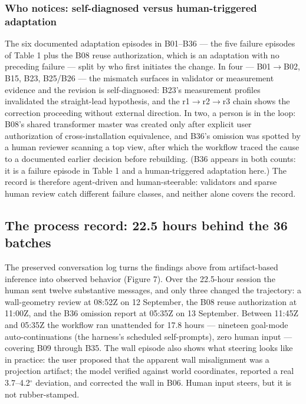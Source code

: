 \documentclass[10pt,a4paper]{article}
\begin{document}
\hypertarget{who-notices-self-diagnosed-versus-human-triggered-adaptation}{%
\subsubsection{Who notices: self-diagnosed versus human-triggered
adaptation}\label{who-notices-self-diagnosed-versus-human-triggered-adaptation}}

The six documented adaptation episodes in B01--B36 --- the five failure
episodes of Table 1 plus the B08 reuse authorization, which is an
adaptation with no preceding failure --- split by who first initiates
the change. In four --- B01\(\rightarrow\)B02, B15, B23, B25/B26 --- the
mismatch surfaces in validator or measurement evidence and the revision
is self-diagnosed: B23's measurement profiles invalidated the
straight-lead hypothesis, and the r1\(\rightarrow\)r2\(\rightarrow\)r3
chain shows the correction proceeding without external direction. In
two, a person is in the loop: B08's shared transformer master was
created only after explicit user authorization of cross-installation
equivalence, and B36's omission was spotted by a human reviewer scanning
a top view, after which the workflow traced the cause to a documented
earlier decision before rebuilding. (B36 appears in both counts: it is a
failure episode in Table 1 and a human-triggered adaptation here.) The
record is therefore agent-driven and human-steerable: validators and
sparse human review catch different failure classes, and neither alone
covers the record.

\hypertarget{the-process-record-22.5-hours-behind-the-36-batches}{%
\subsection{The process record: 22.5 hours behind the 36
batches}\label{the-process-record-22.5-hours-behind-the-36-batches}}

The preserved conversation log turns the findings above from
artifact-based inference into observed behavior (Figure 7). Over the
22.5-hour session the human sent twelve substantive messages, and only
three changed the trajectory: a wall-geometry review at 08:52Z on 12
September, the B08 reuse authorization at 11:00Z, and the B36 omission
report at 05:35Z on 13 September. Between 11:45Z and 05:35Z the workflow
ran unattended for 17.8 hours --- nineteen goal-mode auto-continuations
(the harness's scheduled self-prompts), zero human input --- covering
B09 through B35. The wall episode also shows what steering looks like in
practice: the user proposed that the apparent wall misalignment was a
projection artifact; the model verified against world coordinates,
reported a real 3.7--4.2\(^\circ\) deviation, and corrected the wall in
B06. Human input steers, but it is not rubber-stamped.
\end{document}
